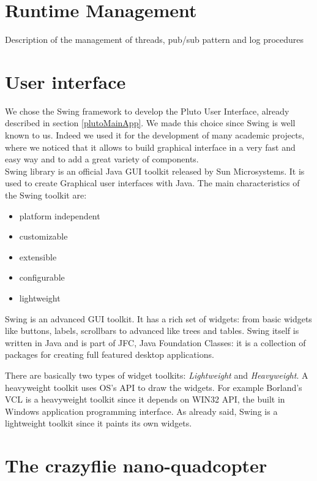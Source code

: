 \section{Runtime Management}\label{runtimeMng}

Description of the management of threads, pub/sub pattern and log procedures

\section{User interface}\label{interface}

We chose the Swing framework to develop the Pluto User Interface, already described in section \ref{plutoMainApp}.
We made this choice since Swing is well known to us.
Indeed we used it for the development of many academic projects, where we noticed that it allows to build graphical interface in a very fast and easy way and to add a great variety of components.
\\

Swing library is an official Java GUI toolkit released by Sun Microsystems. It is used to create Graphical user interfaces with Java.
The main characteristics of the Swing toolkit are:
\begin{itemize}
\item platform independent
\item customizable
\item extensible
\item configurable
\item lightweight
\end{itemize}

Swing is an advanced GUI toolkit. It has a rich set of widgets:
from basic widgets like buttons, labels, scrollbars to advanced like trees and tables. 
Swing itself is written in Java and is part of JFC, Java Foundation Classes: it is a collection of packages for creating full featured desktop applications.

There are basically two types of widget toolkits: \textit{Lightweight} and \textit{Heavyweight}.
A heavyweight toolkit uses OS's API to draw the widgets. For example Borland's VCL is a heavyweight toolkit since it depends on WIN32 API, the built in Windows application programming interface.
As already said, Swing is a lightweight toolkit since it paints its own widgets.

\section{The crazyflie nano-quadcopter}\label{crazyflie}


